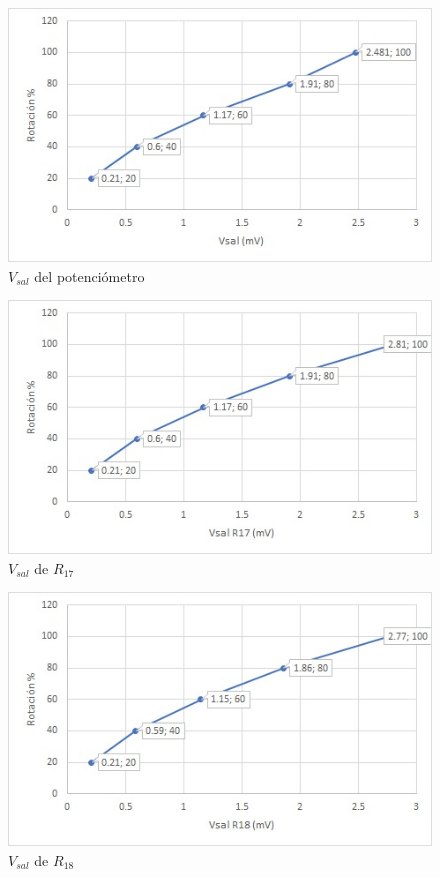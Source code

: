 \begin{enumerate}
	\\
	\\
	\begin{figure}[h]
		\centering
		\includegraphics[scale = 0.75]{imagenes/10.1}
		\caption{$V_{sal}$ del potenciómetro}
	\end{figure}
	\begin{figure}[h]
		\centering
		\includegraphics[scale = 0.75]{imagenes/10.2}
		\caption{$V_{sal}$ de $R_{17}$}
	\end{figure}
	\begin{figure}[h]
		\centering
		\includegraphics[scale = 0.75]{imagenes/10.3}
		\caption{$V_{sal}$ de $R_{18}$}
	\end{figure}
\end{enumerate}
